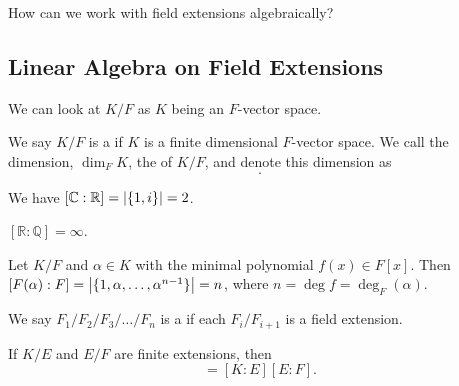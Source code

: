 \documentclass[notoc,notitlepage]{tufte-book}
\begin{document}
How can we work with field extensions algebraically?

\subsection{Linear Algebra on Field Extensions}%
\label{sub:linear_algebra_on_field_extensions}

We can look at $K / F$ as $K$ being an $F$-vector space.

\begin{defn}\label{defn:finite_extension}
  We say $K / F$ is a  if $K$ is a finite dimensional $F$-vector space.
  We call the dimension, $\dim_F K$, the  of $K / F$, and denote this dimension as
  \begin{equation*}
    [ K : F ].
  \end{equation*}
\end{defn}

\begin{eg}
  We have $[ \mathbb{C} : \mathbb{R} ] = \left| \{ 1, i \} \right| = 2$.
\end{eg}

\begin{eg}
  $[ \mathbb{R} : \mathbb{Q} ] = \infty$.
\end{eg}

\begin{eg}
  Let $K / F$ and $\alpha \in K$ with the minimal polynomial $f(x) \in F[x]$.
  Then $[ F(\alpha) : F ] = \left| \{ 1, \alpha, \ldots, \alpha^{n - 1} \} \right| = n$,
  where $n = \deg f = \deg_F(\alpha)$.
\end{eg}

\begin{defn}\label{defn:tower_of_fields}
  We say $F_1 / F_2 / F_3 / \hdots / F_n$ is a  if each $F_i / F_{i + 1}$
  is a field extension.
\end{defn}

\begin{thm}\label{thm:tower_theorem}
  If $K / E$ and $E / F$ are finite extensions, then
  \begin{equation*}
    [K : F] = [K : E] [E : F].
  \end{equation*}
\end{thm}
\end{document}
